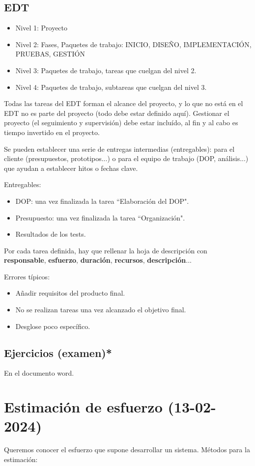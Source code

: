 \documentclass{article}
\begin{document}
\subsection{EDT}
\begin{itemize}
	\item Nivel 1: Proyecto
	\item Nivel 2: Fases, Paquetes de trabajo: INICIO, DISEÑO, IMPLEMENTACIÓN, PRUEBAS, GESTIÓN
	\item Nivel 3: Paquetes de trabajo, tareas que cuelgan del nivel 2.
	\item Nivel 4: Paquetes de trabajo, subtareas que cuelgan del nivel 3.
\end{itemize}
Todas las tareas del EDT forman el alcance del proyecto, y lo que no está en el EDT no es parte del proyecto (todo debe estar definido aquí). 
Gestionar el proyecto (el seguimiento y supervisión) debe estar incluído, al fin y al cabo es tiempo invertido en el proyecto. 

Se pueden establecer una serie de entregas intermedias (entregables): para el cliente (presupuestos, prototipos...) o para el equipo de trabajo (DOP, análisis...) que ayudan a establecer hitos o fechas clave. 

Entregables:
\begin{itemize}
	\item DOP: una vez finalizada la tarea ``Elaboración del DOP".
	\item Presupuesto: una vez finalizada la tarea ``Organización".
	\item Resultados de los tests.
\end{itemize}

Por cada tarea definida, hay que rellenar la hoja de descripción con \textbf{responsable}, \textbf{esfuerzo}, \textbf{duración}, \textbf{recursos}, \textbf{descripción}...

Errores típicos:
\begin{itemize}
	\item Añadir requisitos del producto final.
	\item No se realizan tareas una vez alcanzado el objetivo final.
	\item Desglose poco específico.
\end{itemize}

\subsection{Ejercicios (examen)*}
En el documento word.
\section{Estimación de esfuerzo (13-02-2024)}
Queremos conocer el esfuerzo que supone desarrollar un sistema. 
Métodos para la estimación:
\end{document}
